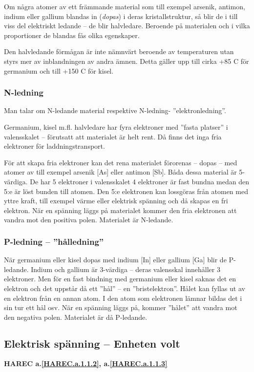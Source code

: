 Om några atomer av ett främmande material som till exempel arsenik, antimon,
indium eller gallium blandas in (\emph{dopas}) i deras kristallstruktur, så blir
de i till viss del elektriskt ledande -- de blir halvledare.
Beroende på materialen och i vilka proportioner de blandas fås olika egenskaper.

Den halvledande förmågan är inte nämnvärt beroende av temperaturen utan styrs mer
av inblandningen av andra ämnen.
Detta gäller upp till cirka +85 \degree C för germanium och till +150 \degree C
för kisel.

\subsubsection{N-ledning}
Man talar om N-ledande material respektive N-ledning- ''elektronledning''.

Germanium, kisel m.fl. halvledare har fyra elektroner med ''fasta platser'' i
valensskalet -- förutsatt att materialet är helt rent.
Då finns det inga fria elektroner för laddningstransport.

För att skapa fria elektroner kan det rena materialet förorenas -- dopas -- med
atomer av till exempel arsenik [As] eller antimon [Sb].
Båda dessa material är 5-värdiga.
De har 5 elektroner i valensskalet 4 elektroner är fast bundna medan
den 5:e är löst bunden till atomen.
Den 5:e elektronen kan lossgöras från atomen med yttre kraft, till exempel värme eller
elektrisk spänning och då skapas en fri elektron.
När en spänning läggs på materialet kommer den fria elektronen att vandra mot
den positiva polen.
Materialet är N-ledande.

\subsubsection{P-ledning -- ''hålledning''}
När germanium eller kisel dopas med indium [In] eller gallium [Ga] blir de
P-ledande.
Indium och gallium är 3-värdiga -- deras valensskal innehåller 3 elektroner.
Men för en fast bindning med germanium eller kisel saknas det en elektron och
det uppstår då ett ''hål'' -- en ''bristelektron''.
Hålet kan fyllas ut av en elektron från en annan atom.
I den atom som elektronen lämnar bildas det i sin tur ett hål osv.
När en spänning läggs på, kommer ''hålet'' att vandra mot den negativa polen.
Materialet är då P-ledande.

\subsection{Elektrisk spänning -- Enheten volt}
\textbf{HAREC a.\ref{HAREC.a.1.1.2}\label{myHAREC.a.1.1.2b}, a.\ref{HAREC.a.1.1.3}\label{myHAREC.a.1.1.3b}}

